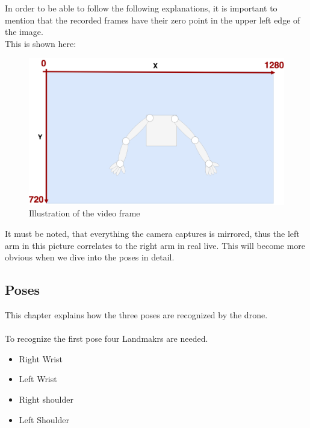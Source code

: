 \documentclass[a4paper,11pt,singlespacing]{article}
\begin{document}
In order to be able to follow the following explanations, it is important to mention that the recorded frames have their 
zero point in the upper left edge of the image.\\
This is shown here:

\begin{figure}[H]
	\centering
	\includegraphics[width=\textwidth]{images/video_frame.png}
	\caption{Illustration of the video frame}
	\label{video_frame}
\end{figure}

It must be noted, that everything the camera captures is mirrored, thus the left arm 
in this picture correlates to the right arm in real live.
This will become more obvious when we dive into the poses in detail.

\subsection{Poses}

This chapter explains how the three poses are recognized by the drone.\\\\

To recognize the first pose four Landmakrs are needed.
\begin{itemize}
	\item Right Wrist
	\item Left Wrist
	\item Right shoulder
	\item Left Shoulder
\end{itemize}
\end{document}
